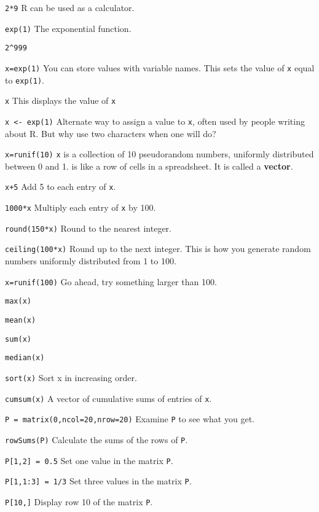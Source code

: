 \blist{-0.05in}
\vspace{-0.1in}
\item {\tt 2*9}       \hfill R can be used as a calculator.
\item {\tt exp(1)} \hfill The exponential function.
\item {\tt 2\^{}999}
\item {\tt x=exp(1)}  \hfill You can store values with variable names.
\new This sets the value of {\tt x} equal to {\tt exp(1)}.
\item {\tt x}         \hfill This displays the value of {\tt x}
\item {\tt x <- exp(1)} \hfill Alternate way to assign a value to {\tt x}, often used by people writing about R.  \new But why use two characters when one will do?
\item {\tt x=runif(10)} \hfill {\tt x} is a collection of 10 pseudorandom
numbers, uniformly distributed between 0 and 1.  is like a row
of cells in a spreadsheet.  It is called a {\bf vector}.
\item {\tt x+5}       \hfill Add 5 to each entry of {\tt x}.
\item {\tt 1000*x}       \hfill Multiply each entry of {\tt x} by 100.
\item {\tt round(150*x)} \hfill Round to the nearest integer.
\item {\tt ceiling(100*x)} \hfill Round up to the next integer. This is how you generate \new random numbers uniformly distributed from 1 to 100.
\item {\tt x=runif(100)} \hfill Go ahead, try something larger than 100.
\item {\tt max(x)} \hfill
\item {\tt mean(x)} \hfill
\item {\tt sum(x)} \hfill
\item {\tt median(x)} \hfill
\item {\tt sort(x)} \hfill Sort x in increasing order.
\item {\tt cumsum(x)} \hfill A vector of cumulative sums of entries of {\tt x}.

\item {\tt P = matrix(0,ncol=20,nrow=20)} \hfill Examine {\tt P} to see what you get.
\item {\tt rowSums(P)} \hfill Calculate the sums of the rows of {\tt P}.
\item {\tt P[1,2] = 0.5} \hfill Set one value in the matrix {\tt P}.
\item {\tt P[1,1:3] = 1/3} \hfill Set three values in the matrix {\tt P}.
\item {\tt P[10,]} \hfill Display row 10 of the matrix {\tt P}.

